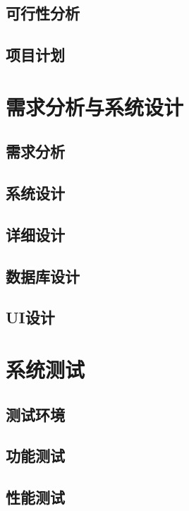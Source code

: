 \documentclass[UTF8,a4paper,10pt]{ctexart}
\begin{document}
\subsection{可行性分析}

\subsection{项目计划}

\section{需求分析与系统设计}

\subsection{需求分析}

\subsection{系统设计}

\subsection{详细设计}

\subsection{数据库设计}

\subsection{UI设计}

\section{系统测试}

\subsection{测试环境}

\subsection{功能测试}

\subsection{性能测试}
\end{document}
